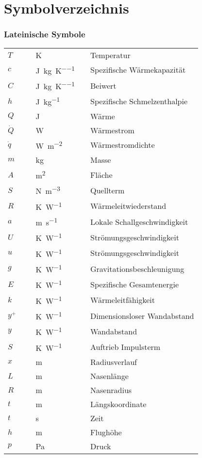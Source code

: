 \chapter*{Symbolverzeichnis}
	
\subsection*{Lateinische Symbole}

\begin{supertabular}{p{10mm}p{3mm}p{20mm}p{3mm}l}
$T$ && \SI{}{\kelvin} && Temperatur\\
$c$ && \SI{}{\joule\per\kilogram\per\kelvin} && Spezifische Wärmekapazität\\
$C$ && \SI{}{\joule\per\kilogram\per\kelvin} && Beiwert\\
$h$ && \SI{}{\joule\per\kilogram} && Spezifische Schmelzenthalpie\\
$Q$ && \SI{}{\joule} && Wärme\\
$\dot{Q}$ && \SI{}{\watt} && Wärmestrom\\
$\dot{q}$ && \SI{}{\watt\per\meter\squared} && Wärmestromdichte\\ 
$m$ && \SI{}{\kilo\gram} && Masse\\
$A$ && \SI{}{\meter\squared} && Fläche\\
$S$ && \SI{}{\newton\per\meter\cubed} && Quellterm\\
$R$ && \SI{}{\kelvin\per\watt} && Wärmeleitwiederstand\\
$a$ && \SI{}{\meter\per\second} && Lokale Schallgeschwindigkeit\\
$U$ && \SI{}{\kelvin\per\watt} && Strömungsgeschwindigkeit\\
$u$ && \SI{}{\kelvin\per\watt} && Strömungsgeschwindigkeit\\
$g$ && \SI{}{\kelvin\per\watt} && Gravitationsbeschleunigung\\
$E$ && \SI{}{\kelvin\per\watt} && Spezifische Gesamtenergie\\
$k$ && \SI{}{\kelvin\per\watt} && Wärmeleitfähigkeit\\
$y^+$ && \SI{}{\kelvin\per\watt} && Dimensionsloser Wandabstand\\
$y$ && \SI{}{\kelvin\per\watt} && Wandabstand\\
$S$ && \SI{}{\kelvin\per\watt} && Auftrieb Impulsterm\\
$x$ && \SI{}{\meter} && Radiusverlauf\\
$L$ && \SI{}{\meter} && Nasenlänge\\
$R$ && \SI{}{\meter} && Nasenradius\\
$t$ && \SI{}{\meter} && Längskoordinate\\
$t$ && \SI{}{\second} && Zeit\\
$h$ && \SI{}{\meter} && Flughöhe\\
$p$ && \SI{}{\pascal} && Druck\\
\end{supertabular}


